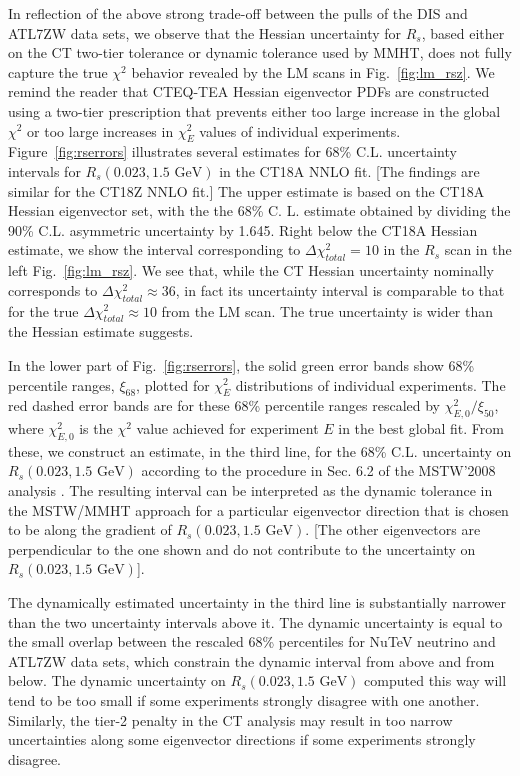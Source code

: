 In reflection of the above strong trade-off between the pulls of the
DIS and ATL7ZW data sets, we observe that the Hessian uncertainty for $R_s$,
based either on the CT two-tier tolerance or dynamic tolerance used by MMHT, does not fully capture the true $\chi^2$ behavior revealed by the LM scans in Fig.~\ref{fig:lm_rsz}. We remind the reader that CTEQ-TEA Hessian eigenvector PDFs are constructed using a two-tier prescription \cite{Lai:2010vv,Gao:2013xoa} that prevents either too large increase in the global $\chi^2$ or too large increases in $\chi^2_E$ values of individual experiments. Figure~\ref{fig:rserrors} illustrates several estimates for 68\% C.L. uncertainty intervals for $R_s(0.023,1.5\mbox{ GeV})$ in the CT18A NNLO fit. [The findings are similar for the CT18Z NNLO fit.] The upper estimate is based on the CT18A Hessian eigenvector set, with the the 68\% C. L. estimate obtained by dividing the 90\% C.L. asymmetric uncertainty by 1.645. Right below the CT18A Hessian estimate, we show the interval corresponding to $\Delta \chi^2_{total}=10$ in the $R_s$ scan in the left Fig.~\ref{fig:lm_rsz}. We see that, while the CT Hessian uncertainty nominally corresponds to $\Delta \chi^2_{total}\approx 36$, in fact its uncertainty interval is comparable to that for the true $\Delta \chi^2_{total}\approx 10$ from the LM scan. The true uncertainty is wider than the Hessian estimate suggests. 

In the lower part of Fig.~\ref{fig:rserrors}, the solid green error bands show 68\% percentile ranges, $\xi_{68}$, plotted for $\chi^2_E$ distributions of individual experiments. The red dashed error bands are for these 68\% percentile ranges rescaled by $\chi^2_{E,0}/\xi_{50}$, where $\chi^2_{E,0}$ is the $\chi^2$ value achieved for experiment $E$ in the best global fit. From these, we construct an estimate, in the third line, for the 68\% C.L. uncertainty on $R_s(0.023,1.5\mbox{ GeV})$ according to the procedure in Sec. 6.2 of the MSTW'2008 analysis \cite{Martin:2009iq}. The resulting interval can be interpreted as the dynamic tolerance in the MSTW/MMHT approach for a particular eigenvector direction that is chosen to be along the gradient of $R_s(0.023,1.5\mbox{ GeV})$. [The other eigenvectors are perpendicular to the one shown and do not contribute to the uncertainty on $R_s(0.023,1.5\mbox{ GeV})$]. 

The dynamically estimated uncertainty in the third line is substantially narrower than the two uncertainty intervals above it. The dynamic uncertainty is equal to the small overlap between the rescaled 68\% percentiles for NuTeV neutrino and ATL7ZW data sets, which constrain the dynamic interval from above and from below. The dynamic uncertainty on $R_s(0.023,1.5\mbox{ GeV})$ computed this way will tend to be too small if some experiments strongly disagree with one another. 
Similarly, the tier-2 penalty in the CT analysis may result in too narrow uncertainties along some eigenvector directions if some experiments strongly disagree. 

